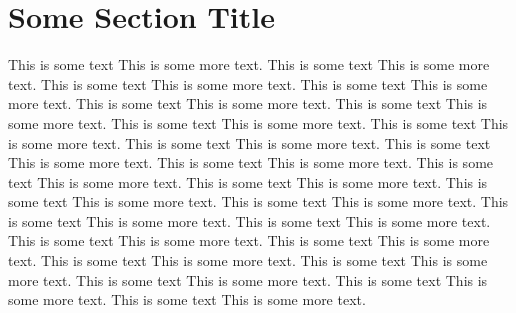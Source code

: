 \documentclass[11pt,epsfig]{article}
\begin{document}
\section{Some Section Title}
This is some text This is some more text. This is some text This is some more text. This is some text This is some more text. This is some text This is some more text. This is some text This is some more text. This is some text This is some more text. This is some text This is some more text. This is some text This is some more text. This is some text This is some more text. This is some text This is some more text. This is some text This is some more text. This is some text This is some more text. This is some text This is some more text. This is some text This is some more text. This is some text This is some more text. This is some text This is some more text. This is some text This is some more text. This is some text This is some more text. This is some text This is some more text. This is some text This is some more text. This is some text This is some more text. This is some text This is some more text. This is some text This is some more text. This is some text This is some more text. 
\end{document}
